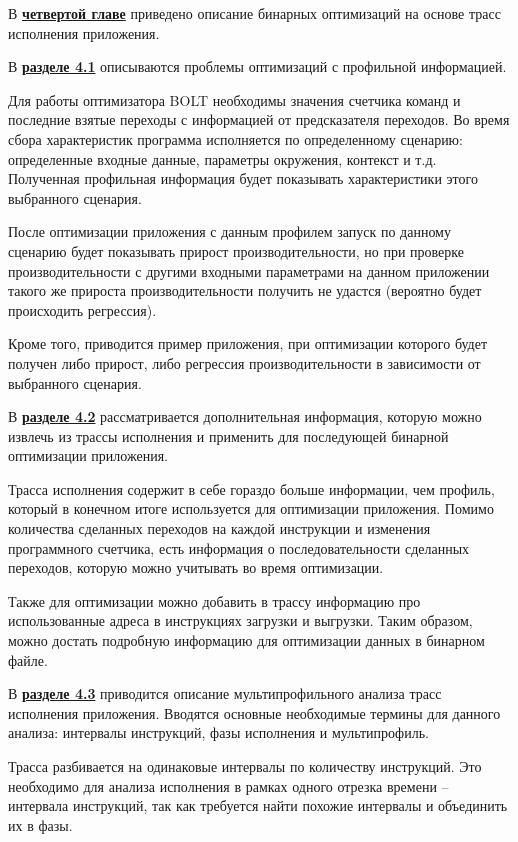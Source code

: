 В \underline{\textbf{четвертой главе}} приведено описание бинарных оптимизаций на основе трасс исполнения приложения.

В \underline{\textbf{разделе 4.1}} описываются проблемы оптимизаций с профильной информацией.

Для работы оптимизатора BOLT необходимы значения счетчика команд и последние взятые переходы с информацией от предсказателя переходов. Во время сбора характеристик программа исполняется по определенному сценарию: определенные входные данные, параметры окружения, контекст и т.д. Полученная профильная информация будет показывать характеристики этого выбранного сценария.

После оптимизации приложения с данным профилем запуск по данному сценарию будет показывать прирост производительности, но при проверке производительности с другими входными параметрами на данном приложении такого же прироста производительности получить не удастся (вероятно будет происходить регрессия).

Кроме того, приводится пример приложения, при оптимизации которого будет получен либо прирост, либо регрессия производительности в зависимости от выбранного сценария.

В \underline{\textbf{разделе 4.2}} рассматривается дополнительная информация, которую можно извлечь из трассы исполнения и применить для последующей бинарной оптимизации приложения.

Трасса исполнения содержит в себе гораздо больше информации, чем профиль, который в конечном итоге используется для оптимизации приложения. Помимо количества сделанных переходов на каждой инструкции и изменения программного счетчика, есть информация о последовательности сделанных переходов, которую можно учитывать во время оптимизации.

Также для оптимизации можно добавить в трассу информацию про использованные адреса в инструкциях загрузки и выгрузки. Таким образом, можно достать подробную информацию для оптимизации данных в бинарном файле.

В \underline{\textbf{разделе 4.3}} приводится описание мультипрофильного анализа трасс исполнения приложения. Вводятся основные необходимые термины для данного анализа: интервалы инструкций, фазы исполнения и мультипрофиль.

Трасса разбивается на одинаковые интервалы по количеству инструкций. Это необходимо для анализа исполнения в рамках одного отрезка времени – интервала инструкций, так как требуется найти похожие интервалы и объединить их в фазы.

